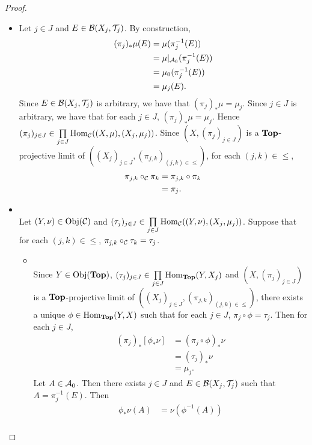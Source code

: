 \documentclass{book}
\begin{document}
\begin{proof}
\begin{enumerate}
			\begin{itemize}
				\item Let $j \in J$ and $E \in \mathcal{B}(X_j, \mathcal{T}_j)$. By construction, 
				\begin{align*}
					(\pi_j)_*\mu(E)
					& = \mu(\pi_j^{-1}(E)) \\
					& = \mu|_{\mathcal{A}_0}(\pi_j^{-1}(E)) \\
					& = \mu_0(\pi_j^{-1}(E)) \\
					& = \mu_j(E).
				\end{align*}
				Since $E \in \mathcal{B}(X_j, \mathcal{T}_j)$ is arbitrary, we have that $(\pi_j)_*\mu = \mu_j$. Since $j \in J$ is arbitrary, we have that for each $j \in J$, $(\pi_j)_*\mu = \mu_j$. Hence $(\pi_j)_{j \in J} \in \prod\limits_{j \in J} \operatorname{Hom}_{\mathcal{C}}((X, \mu), (X_j, \mu_j))$. Since $(X, (\pi_j)_{j \in J})$ is a $\operatorname*{\text{\textbf{Top}}}$-projective limit of $((X_j)_{j \in J}, (\pi_{j,k})_{(j,k) \in {\leq}})$, for each $(j,k) \in {\leq}$, 
				\begin{align*}
					\pi_{j,k} \circ_{\mathcal{C}} \pi_k 
					& = \pi_{j,k} \circ \pi_k \\
					& = \pi_j.
				\end{align*}
				\item {} \\
				Let $(Y, \nu) \in \operatorname{Obj}(\mathcal{C})$ and $(\tau_j)_{j \in J} \in \prod\limits_{j \in J} \operatorname{Hom}_{\mathcal{C}}((Y, \nu),(X_j, \mu_j))$. Suppose that for each $(j,k) \in {\leq}$, $\pi_{j,k} \circ_{\mathcal{C}} \tau_k = \tau_j$. 
				\begin{itemize}
					\item {} \\
					Since $Y \in \operatorname{Obj}(\operatorname*{\text{\textbf{Top}}})$, $(\tau_j)_{j \in J} \in \prod\limits_{j \in J} \operatorname{Hom}_{\operatorname*{\text{\textbf{Top}}}}(Y,X_j)$ and $(X, (\pi_j)_{j \in J})$ is a $\operatorname*{\text{\textbf{Top}}}$-projective limit of $((X_j)_{j \in J}, (\pi_{j,k})_{(j,k) \in {\leq}})$, there exists a unique $\phi \in \operatorname{Hom}_{\operatorname*{\text{\textbf{Top}}}}(Y, X)$ such that for each $j \in J$, $\pi_j \circ \phi = \tau_j$. Then for each $j \in J$,
					\begin{align*}
						(\pi_j)_*[\phi_*\nu]
						& = (\pi_j \circ \phi)_*\nu \\
						& = (\tau_j)_*\nu \\
						& = \mu_j.  
					\end{align*}
					Let $A \in \mathcal{A}_0$. Then there exists $j \in J$ and $E \in \mathcal{B}(X_j, \mathcal{T}_j)$ such that $A = \pi_{j}^{-1}(E)$. Then
					\begin{align*}
						\phi_*\nu(A)
						& = \nu(\phi^{-1}(A)) \\

\end{align*}
\end{itemize}
\end{itemize}
\end{enumerate}
\end{proof}
\end{document}

